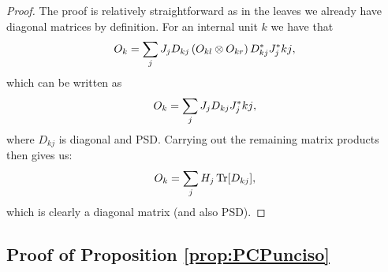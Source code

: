 \propdiagpunc*


\begin{proof}
	The proof is relatively straightforward as in the leaves we already have diagonal matrices by definition. For an internal unit $k$ we have that
	\begin{align}
		O_k = \sum_j J_j D_{kj} \left(O_{kl}\otimes O_{kr} \right)  D_{kj}^* J_j^*{kj},
	\end{align}
	which can be written as
	\begin{align}
		O_k = \sum_j J_j D_{kj} J_j^*{kj},
	\end{align}
	where $D_{kj}$ is diagonal and PSD. Carrying out the remaining matrix products then gives us:
	\begin{align}
		O_k = \sum_j H_j \Tr [D_{kj}],
	\end{align}
	which is clearly a diagonal matrix (and also PSD).
\end{proof}



\subsection{Proof of Proposition \ref{prop:PCPunciso}}
\label{sec:proof:prop:PCPunciso}


\propPCPunciso*

